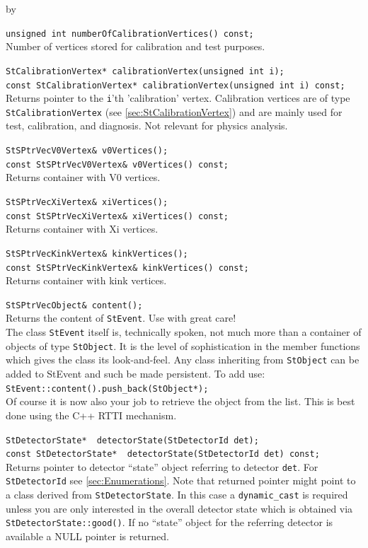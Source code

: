 \documentclass[twoside]{article}
\newcommand{\entrylabel}[1]{\mbox{\textbf{{#1}}}\hfil}%
\newenvironment{entry}
{\begin{list}{}%
    {\renewcommand{\makelabel}{\entrylabel}%
     \setlength{\labelwidth}{90pt}%
     \setlength{\leftmargin}{\labelwidth}
     \advance\leftmargin by \labelsep%
      }%
    }%
  {\end{list}}
\newcommand{\Entrylabel}[1]%
{\raisebox{0pt}[1ex][0pt]{\makebox[\labelwidth][l]%
    {\parbox[t]{\labelwidth}{\hspace{0pt}\textbf{{#1}}}}}}
\newenvironment{Entry}%
{\renewcommand{\entrylabel}{\Entrylabel}\begin{entry}}%
  {\end{entry}}
\begin{document}
\begin{Entry}
    \verb+unsigned int numberOfCalibrationVertices() const;+\\
    Number of vertices stored for calibration and test purposes.
    
    \verb+StCalibrationVertex* calibrationVertex(unsigned int i);+\\
    \verb+const StCalibrationVertex* calibrationVertex(unsigned int i) const;+\\
    Returns pointer to the \texttt{i}'th 'calibration' vertex. Calibration
    vertices are of type \texttt{StCalibrationVertex} (see \ref{sec:StCalibrationVertex})
    and are mainly used for test, calibration, and diagnosis. Not relevant for physics analysis.
    
    \verb+StSPtrVecV0Vertex& v0Vertices();+\\
    \verb+const StSPtrVecV0Vertex& v0Vertices() const;+\\
    Returns container with V0 vertices.
    
    \verb+StSPtrVecXiVertex& xiVertices();+\\
    \verb+const StSPtrVecXiVertex& xiVertices() const;+\\
    Returns container with Xi vertices.
    
    \verb+StSPtrVecKinkVertex& kinkVertices();+\\
    \verb+const StSPtrVecKinkVertex& kinkVertices() const;+\\
    Returns container with kink vertices.

    \verb+StSPtrVecObject& content();+\\
    Returns the content of \texttt{StEvent}. Use with great care!\\
    The class \texttt{StEvent} itself is, technically spoken, not
    much more than a container of objects of type \texttt{StObject}.
    It is the level of sophistication in the member functions
    which gives the class its look-and-feel. Any class inheriting
    from \texttt{StObject} can be added to StEvent and such be made
    persistent. To add use:\\
    \texttt{StEvent::content().push\_back(StObject*);}\\
    Of course it is now also your job to retrieve the object from the
    list. This is best done using the C++ RTTI mechanism.
    
    \verb+StDetectorState*  detectorState(StDetectorId det);+\\
    \verb+const StDetectorState*  detectorState(StDetectorId det) const;+\\
    Returns pointer to detector ``state'' object referring to detector \texttt{det}.
    For \texttt{StDetectorId} see \ref{sec:Enumerations}. Note that returned pointer
    might point to a class derived from \texttt{StDetectorState}. In this case
    a \texttt{dynamic\_cast} is required unless you are only interested in the overall
    detector state which is obtained via \texttt{StDetectorState::good()}.
    If no ``state'' object for the referring detector is available a NULL pointer
    is returned.


\end{Entry}
\end{document}
